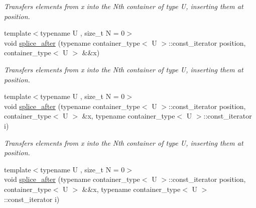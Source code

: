 \begin{DoxyCompactItemize}
\begin{DoxyCompactList}\small\item\em Transfers elements from x into the Nth container of type U, inserting them at position. \end{DoxyCompactList}\item 
\hypertarget{classheterogeneous_1_1heteroforward__list_3_01_t_00_01_types_8_8_8_4_ac542af0f8f98ba03860d61179d578a39}{}{\footnotesize template$<$typename U , size\+\_\+t N = 0$>$ }\\void \hyperlink{classheterogeneous_1_1heteroforward__list_3_01_t_00_01_types_8_8_8_4_ac542af0f8f98ba03860d61179d578a39}{splice\+\_\+after} (typename container\+\_\+type$<$ U $>$\+::const\+\_\+iterator position, container\+\_\+type$<$ U $>$ \&\&x)\label{classheterogeneous_1_1heteroforward__list_3_01_t_00_01_types_8_8_8_4_ac542af0f8f98ba03860d61179d578a39}

\begin{DoxyCompactList}\small\item\em Transfers elements from x into the Nth container of type U, inserting them at position. \end{DoxyCompactList}\item 
\hypertarget{classheterogeneous_1_1heteroforward__list_3_01_t_00_01_types_8_8_8_4_af543af258b29e3856f759c6f7b3db639}{}{\footnotesize template$<$typename U , size\+\_\+t N = 0$>$ }\\void \hyperlink{classheterogeneous_1_1heteroforward__list_3_01_t_00_01_types_8_8_8_4_af543af258b29e3856f759c6f7b3db639}{splice\+\_\+after} (typename container\+\_\+type$<$ U $>$\+::const\+\_\+iterator position, container\+\_\+type$<$ U $>$ \&x, typename container\+\_\+type$<$ U $>$\+::const\+\_\+iterator i)\label{classheterogeneous_1_1heteroforward__list_3_01_t_00_01_types_8_8_8_4_af543af258b29e3856f759c6f7b3db639}

\begin{DoxyCompactList}\small\item\em Transfers elements from x into the Nth container of type U, inserting them at position. \end{DoxyCompactList}\item 
\hypertarget{classheterogeneous_1_1heteroforward__list_3_01_t_00_01_types_8_8_8_4_a6f04eacadd0110ad22ab48816c4536a4}{}{\footnotesize template$<$typename U , size\+\_\+t N = 0$>$ }\\void \hyperlink{classheterogeneous_1_1heteroforward__list_3_01_t_00_01_types_8_8_8_4_a6f04eacadd0110ad22ab48816c4536a4}{splice\+\_\+after} (typename container\+\_\+type$<$ U $>$\+::const\+\_\+iterator position, container\+\_\+type$<$ U $>$ \&\&x, typename container\+\_\+type$<$ U $>$\+::const\+\_\+iterator i)\label{classheterogeneous_1_1heteroforward__list_3_01_t_00_01_types_8_8_8_4_a6f04eacadd0110ad22ab48816c4536a4}


\end{DoxyCompactItemize}
